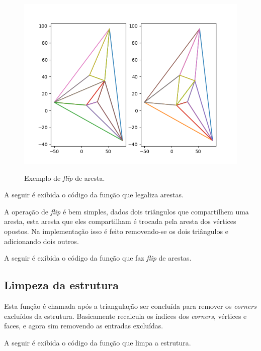 \documentclass[a4paper]{article}
\begin{document}
\begin{figure}[H]
	\centering
	\includegraphics[width=1.0\textwidth]{./imgs/flip_example.png}
	\label{fig:flip} 
	\caption[caption]{Exemplo de \textit{flip} de aresta.}
\end{figure}

A seguir é exibida o código da função que legaliza arestas.


A operação de \textit{flip} é bem simples, dados dois triângulos que compartilhem uma aresta, esta aresta que eles compartilham é trocada pela aresta dos vértices opostos. Na implementação isso é feito removendo-se os dois triângulos e adicionando dois outros. 

A seguir é exibida o código da função que faz \textit{flip} de arestas.





\subsection{Limpeza da estrutura}

Esta função é chamada após a triangulação ser concluída para remover os \textit{corners} excluídos da estrutura. Basicamente recalcula os índices dos \textit{corners}, vértices e faces, e agora sim removendo as entradas excluídas.


A seguir é exibida o código da função que limpa a estrutura.
\end{document}
